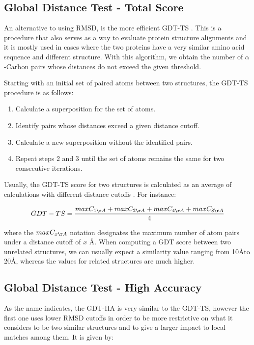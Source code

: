 \medskip
\subsection{Global Distance Test - Total Score}

An alternative to using RMSD, is the more efficient \gls{GDT-TS} \cite{zemla2003lga}. This is a procedure that also serves as a way to evaluate protein structure alignments and it is mostly used in cases where the two proteins have a very similar amino acid sequence and different structure. With this algorithm, we obtain the number of $\alpha$-Carbon pairs whose distances do not exceed the given threshold. 

Starting with an initial set of paired atoms between two structures, the GDT-TS procedure is as follows:
\begin{enumerate}
	\item Calculate a superposition for the set of atoms.
	\item Identify pairs whose distances exceed a given distance cutoff.
	\item Calculate a new superposition without the identified pairs.
	\item Repeat steps 2 and 3 until the set of atoms remains the same for two consecutive iterations.
\end{enumerate}

Usually, the GDT-TS score for two structures is calculated as an average of calculations with different distance cutoffs \cite{poleksic2009algorithms}. For instance:

$$ GDT-TS = \frac{ max C_{1\AA} + max C_{2\AA} + max C_{4\AA} + max C_{8\AA} } {4} $$
	
where the $max C_{x\AA}$ notation designates the maximum number of atom pairs under a distance cutoff of $x$ \AA. When computing a GDT score between two unrelated structures, we can usually expect a similarity value ranging from 10\AA to 20\AA, whereas the values for related structures are much higher. \cite{herbert2008maxcluster}

\medskip
\subsection{Global Distance Test - High Accuracy}

As the name indicates, the GDT-HA is very similar to the GDT-TS, however the first one uses lower RMSD cutoffs in order to be more restrictive on what it considers to be two similar structures and to give a larger impact to local matches among them. It is given by:

